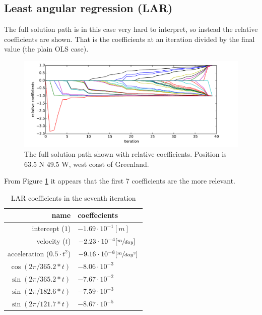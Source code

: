\subsection{Least angular regression (LAR)}
\label{section:result-lar}

The full solution path is in this case very hard to interpret, so instead the relative coefficients are shown. That is the coefficients at an iteration divided by the final value (the plain OLS case).

\begin{figure}[H]
	\centering
	\includegraphics[width=\textwidth]{figures/lar-coefficients}
	\caption{The full solution path shown with relative coefficients. Position is 63.5 N 49.5 W, west coast of Greenland.}
	\label{fig:lar-coefficients}
\end{figure}

From Figure \ref{fig:lar-coefficients} it appears that the first 7 coefficients are the more relevant. 
\begin{table}[H]
\centering
\begin{tabular}{r|l}
name                 & coeffecients \\ \hline
intercept ($1$) & $-1.69 \cdot 10^{-1}[m]$ \\
velocity ($t$) & $-2.23 \cdot 10^{-4} [\sfrac{m}{day}]$ \\
acceleration ($0.5 \cdot t^2$) & $-9.16 \cdot 10^{-8} [\sfrac{m}{day^2}] $ \\
$\cos(2 \pi /365.2 * t)$ & $-8.06 \cdot 10^{-3}$ \\
$\sin(2 \pi /365.2 * t)$ & $-7.67 \cdot 10^{-2}$ \\
$\sin(2 \pi /182.6 * t)$ & $-7.59 \cdot 10^{-3}$ \\
$\sin(2 \pi /121.7 * t)$ & $-8.67 \cdot 10^{-5}$
\end{tabular}
\caption{LAR coefficients in the seventh iteration}
\end{table}

